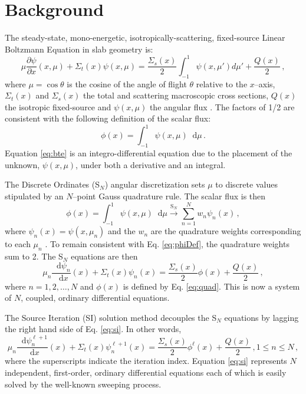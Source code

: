 \documentclass{anstrans}
\newcommand{\SN}{S$_N$\xspace}
\newcommand{\ud}{\mathop{}\!\mathrm{d}} %
\newcommand{\pderiv}[2]{\frac{\partial #1}{\partial #2}}
\newcommand{\dderiv}[2]{\frac{\ud #1}{\ud #2}}
\begin{document}
\section{Background}
	The steady-state, mono-energetic, isotropically-scattering, fixed-source Linear Boltzmann Equation in slab geometry is: 
		\begin{equation} \label{eq:bte}
			\mu \pderiv{\psi}{x}(x, \mu) + \Sigma_t(x) \psi(x,\mu) = 
			\frac{\Sigma_s(x)}{2} \int_{-1}^{1} \psi(x, \mu') d\mu' + \frac{Q(x)}{2} \,,
		\end{equation}
	where $\mu = \cos\theta$ is the cosine of the angle of flight $\theta$ relative to the $x$--axis, $\Sigma_t(x)$ and $\Sigma_s(x)$ the total and scattering macroscopic cross sections, $Q(x)$ the isotropic fixed-source and $\psi(x, \mu)$ the angular flux \cite{adams}. The factors of 1/2 are consistent with the following definition of the scalar flux:
		\begin{equation} \label{eq:phiDef}
			\phi(x) = \int_{-1}^1 \psi(x, \mu) \ud \mu \,.
		\end{equation}
	Equation \ref{eq:bte} is an integro-differential equation due to the placement of the unknown, $\psi(x,\mu)$, under both a derivative and an integral.

	The Discrete Ordinates (\SN) angular discretization sets $\mu$ to discrete values stipulated by an $N$--point Gauss quadrature rule. The scalar flux is then 
		\begin{equation} \label{eq:quad}
			\phi(x) = \int_{-1}^1 \psi(x, \mu) \ud\mu 
				\xrightarrow{\text{S}_N} \sum_{n=1}^N w_n \psi_n(x) \,,
		\end{equation}
	where $\psi_n(x) = \psi(x,\mu_n)$ and the $w_n$ are the quadrature weights corresponding to each $\mu_n$ \cite{llnl}. To remain consistent with Eq. \ref{eq:phiDef}, the quadrature weights sum to 2. The \SN equations are then 
		\begin{equation} \label{eq:sn}
			\mu_n \dderiv{\psi_n}{x}(x) + \Sigma_t(x) \psi_n(x) = 
			\frac{\Sigma_s(x)}{2} \phi(x) + \frac{Q(x)}{2} \,, 
		\end{equation}
	where $n = 1, 2, \dots, N$ and $\phi(x)$ is defined by Eq. \ref{eq:quad}. This is now a system of $N$, coupled, ordinary differential equations. 

	The Source Iteration (SI) solution method decouples the \SN equations by lagging the right hand side of Eq. \ref{eq:si}. In other words, 
		\begin{equation} \label{eq:si}
			\mu_n \dderiv{\psi_n^{\ell+1}}{x}(x) + \Sigma_t(x) \psi_n^{\ell+1}(x) = 
			\frac{\Sigma_s(x)}{2} \phi^{\ell}(x) + \frac{Q(x)}{2} \,, 1 \leq n \leq N \,,
		\end{equation}
	where the superscripts indicate the iteration index. 
	Equation \ref{eq:si} represents $N$ independent, first-order, ordinary differential equations each of which is easily solved by the well-known sweeping process. 
\end{document}
